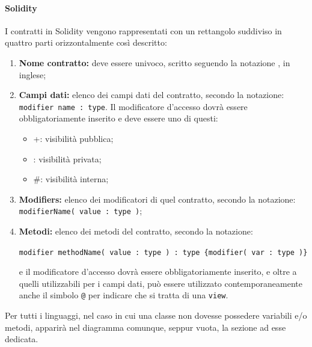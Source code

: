 \documentclass[NormeDiProgetto.tex]{subfiles}
\begin{document}
\paragraph{Solidity}
I contratti in Solidity vengono rappresentati con un rettangolo suddiviso in quattro parti orizzontalmente così descritto:
\begin{enumerate}
	\item \textbf{Nome contratto:} deve essere univoco, scritto seguendo la notazione , in inglese;
	\item \textbf{Campi dati:} elenco dei campi dati del contratto, secondo la notazione: \texttt{modifier name : type}. Il modificatore d'accesso dovrà essere obbligatoriamente inserito e deve essere uno di questi:
	\begin{itemize}
		\item +: visibilità pubblica;
		\item \textendash: visibilità privata;
		\item \#: visibilità interna;
	\end{itemize}
	\item \textbf{Modifiers:} elenco dei modificatori di quel contratto, secondo la notazione:
		\texttt{modifierName( value : type )};
	\item \textbf{Metodi:} elenco dei metodi del contratto, secondo la notazione:
	\begin{center}
		\texttt{modifier methodName( value : type ) : type \{modifier( var : type )\}}
	\end{center}
	e il modificatore d'accesso dovrà essere obbligatoriamente inserito, e oltre a quelli utilizzabili per i campi dati, può essere utilizzato contemporaneamente anche il simbolo \texttt{@} per indicare che si tratta di una \texttt{view}.
\end{enumerate}

Per tutti i linguaggi, nel caso in cui una classe non dovesse possedere variabili e/o metodi, apparirà nel diagramma comunque, seppur vuota, la sezione ad esse dedicata.
\end{document}
